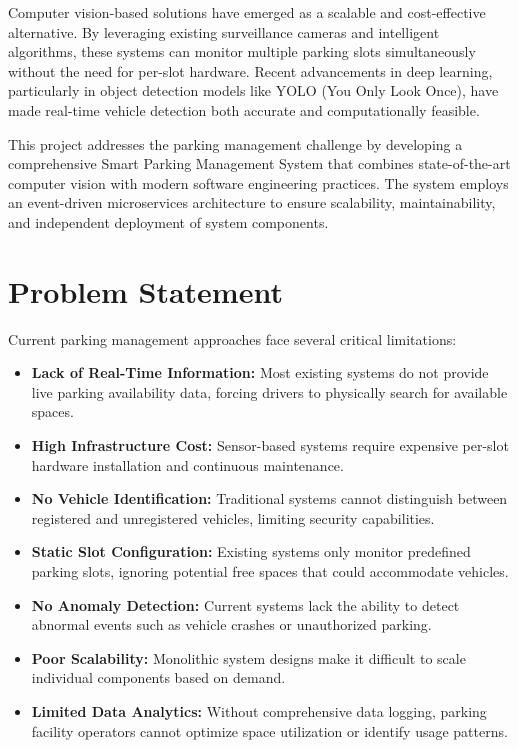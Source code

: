\documentclass[12pt,a4paper]{report}
\begin{document}
Computer vision-based solutions have emerged as a scalable and cost-effective alternative. By leveraging existing surveillance cameras and intelligent algorithms, these systems can monitor multiple parking slots simultaneously without the need for per-slot hardware. Recent advancements in deep learning, particularly in object detection models like YOLO (You Only Look Once), have made real-time vehicle detection both accurate and computationally feasible.

This project addresses the parking management challenge by developing a comprehensive Smart Parking Management System that combines state-of-the-art computer vision with modern software engineering practices. The system employs an event-driven microservices architecture to ensure scalability, maintainability, and independent deployment of system components.

\section{Problem Statement}

Current parking management approaches face several critical limitations:

\begin{itemize}
    \item \textbf{Lack of Real-Time Information:} Most existing systems do not provide live parking availability data, forcing drivers to physically search for available spaces.
    \item \textbf{High Infrastructure Cost:} Sensor-based systems require expensive per-slot hardware installation and continuous maintenance.
    \item \textbf{No Vehicle Identification:} Traditional systems cannot distinguish between registered and unregistered vehicles, limiting security capabilities.
    \item \textbf{Static Slot Configuration:} Existing systems only monitor predefined parking slots, ignoring potential free spaces that could accommodate vehicles.
    \item \textbf{No Anomaly Detection:} Current systems lack the ability to detect abnormal events such as vehicle crashes or unauthorized parking.
    \item \textbf{Poor Scalability:} Monolithic system designs make it difficult to scale individual components based on demand.
    \item \textbf{Limited Data Analytics:} Without comprehensive data logging, parking facility operators cannot optimize space utilization or identify usage patterns.
\end{itemize}
\end{document}
